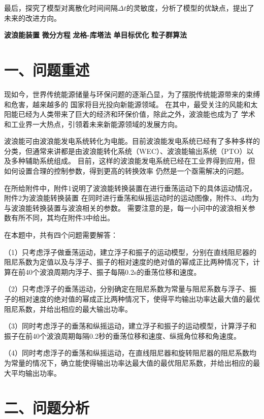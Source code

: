 \documentclass{my_paper}
\begin{document}
最后，探究了模型对离散化时间间隔$\Delta t$的灵敏度，分析了模型的优缺点，提出了未来的改进方向。


\begin{guanjianci}
\quad \textbf{波浪能装置} \quad \textbf{微分方程} \quad \textbf{龙格-库塔法} \quad \textbf{单目标优化} \quad \textbf{粒子群算法}
\end{guanjianci}

\newpage
\section{一、问题重述}
现如今，世界传统能源储量与环保问题的逐渐凸显，为了摆脱传统能源带来的束缚和危害，越来越多的
国家将目光投向新能源领域。
在其中，最受关注的风能和太阳能已经为人类带来了巨大的经济和环保价值，除此之外，波浪能也成为了
学术和工业界一大热点，引领着未来新能源领域的发展方向。

波浪能可由波浪能发电系统转化为电能。目前波浪能发电系统已经有了多种多样的分类，但通常来讲都是由波浪能转化系统（WEC）、波浪能输出系统（PTO）以及多种辅助系统组成。
目前，这样的波浪能发电系统已经在工业界得到应用，但如何设置合理的控制参数，得到更高的转换效率
仍然是一个亟需解决的问题。


在所给附件中，附件1说明了波浪能转换装置在进行垂荡运动下的具体运动情况，附件2为波浪能转换装置
在同时进行垂荡和纵摇运动时的运动图像，附件3、4均为与波浪能转换装置与波浪相关的参数。
需要注意的是，每一小问中的波浪相关参数有所不同，其均在附件3中给出。

在本题中，共有四个问题需要解答：

（1）只考虑浮子做垂荡运动，建立浮子和振子的运动模型，分别在直线阻尼器的阻尼系数为定值以及与浮子、振子的相对速度的绝对值的幂成正比两种情况下，计算在前40个波浪周期内浮子、振子每隔0.2s的垂荡位移和速度。

（2）只考虑浮子的垂荡运动，分别确定在阻尼系数为常量与阻尼系数与浮子、振子的相对速度的绝对值的幂成正比两种情况下，使得平均输出功率达最大值的最优阻尼系数，并给出相应的最大输出功率。

（3）同时考虑浮子的垂荡和纵摇运动，建立浮子和振子的运动模型，计算浮子和振子在前40个波浪周期每隔0.2秒的垂荡位移和速度、纵摇角位移和角速度。

（4）同时考虑浮子的垂荡和纵摇运动，在直线阻尼器和旋转阻尼器的阻尼系数均为常量的情况下，确立能使得输出功率达最大值的最优阻尼系数，并给出相应的最大平均输出功率。

\section{二、问题分析}
  
\end{document}
